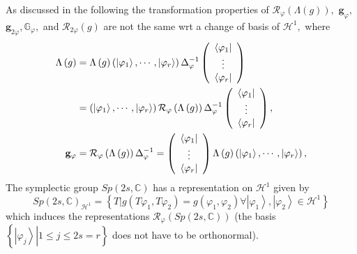 \documentclass[aps,preprint]{revtex4}%
\begin{document}
As discussed in the following the transformation properties of $\mathcal{R}%
_{\varphi}\left(  \Lambda\left(  g\right)  \right)  ,$ $\mathbf{g}_{\varphi},$
$\mathbf{g}_{2\varphi},\mathbb{G}_{\varphi},$ and $\mathcal{R}_{2\varphi
}\left(  g\right)  $ are not the same wrt a change of basis of $\mathcal{H}%
^{1},$ where
\begin{align}
\Lambda\left(  g\right)   &  =\Lambda\left(  g\right)  \left(  \left\vert
\varphi_{1}\right\rangle ,\cdots,\left\vert \varphi_{r}\right\rangle \right)
\Delta_{\varphi}^{-1}\left(
\begin{array}
[c]{c}%
\left\langle \varphi_{1}\right\vert \\
\vdots\\
\left\langle \varphi_{r}\right\vert
\end{array}
\right) \\
&  =\left(  \left\vert \varphi_{1}\right\rangle ,\cdots,\left\vert \varphi
_{r}\right\rangle \right)  \mathcal{R}_{\varphi}\left(  \Lambda\left(
g\right)  \right)  \Delta_{\varphi}^{-1}\left(
\begin{array}
[c]{c}%
\left\langle \varphi_{1}\right\vert \\
\vdots\\
\left\langle \varphi_{r}\right\vert
\end{array}
\right)  ,\\
\mathbf{g}_{\varphi}  &  =\mathcal{R}_{\varphi}\left(  \Lambda\left(
g\right)  \right)  \Delta_{\varphi}^{-1}=\left(
\begin{array}
[c]{c}%
\left\langle \varphi_{1}\right\vert \\
\vdots\\
\left\langle \varphi_{r}\right\vert
\end{array}
\right)  \Lambda\left(  g\right)  \left(  \left\vert \varphi_{1}\right\rangle
,\cdots,\left\vert \varphi_{r}\right\rangle \right)  ,
\end{align}
The symplectic group $Sp\left(  2s,\mathbb{C}\right)  $ has a representation
on $\mathcal{H}^{1}$ given by
\begin{equation}
Sp\left(  2s,\mathbb{C}\right)  _{\mathcal{H}^{1}}=\left\{  \left.
T\right\vert g\left(  T\varphi_{1},T\varphi_{2}\right)  =g\left(  \varphi
_{1},\varphi_{2}\right)  \forall\left\vert \varphi_{1}\right\rangle
,\left\vert \varphi_{2}\right\rangle \in\mathcal{H}^{1}\right\}
\end{equation}
which induces the representations $\mathcal{R}_{\varphi}\left(  Sp\left(
2s,\mathbb{C}\right)  \right)  $ (the basis $\left\{  \left.  \left\vert
\varphi_{j}\right\rangle \right\vert 1\leq j\leq2s=r\right\}  $ does not have
to be orthonormal).
\end{document}
